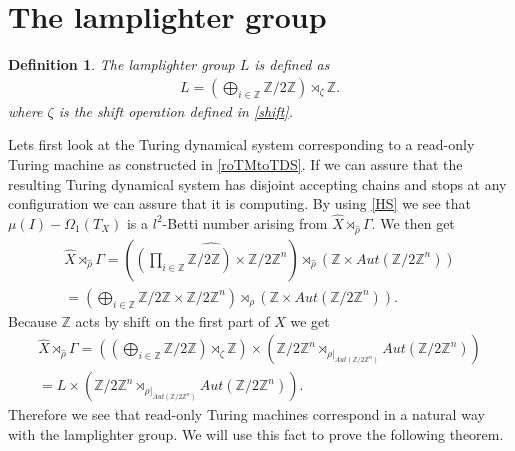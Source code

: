 \documentclass[12pt,a4paper]{scrartcl}
\newtheorem{Definition}[Theorem]{Definition}
\numberwithin{equation}{section}
\newcommand{\Z}{\mathbb{Z}} %
\newcommand{\2}{\mathbb{Z} / 2 \mathbb{Z}}
\newcommand{\1}{\overline{1}}
\newcommand{\0}{\overline{0}}
\begin{document}
\section{The lamplighter group}
\begin{Definition}
	The lamplighter group $L$ is defined as
	\begin{align*}
		L = (\bigoplus_{i \in \Z} \2) \rtimes_{\zeta} \Z.
	\end{align*}
	where $\zeta$ is the shift operation defined in \ref{shift}.
\end{Definition}
Lets first look at the Turing dynamical system corresponding to a read-only Turing machine as constructed in \ref{roTMtoTDS}. If we can assure that the resulting Turing dynamical system has disjoint accepting chains and stops at any configuration we can assure that it is computing. By using \ref{HS} we see that $\mu (I) - \Omega_1(T_X)$ is a $l^2$-Betti number arising from $\hat{X} \rtimes_{\hat{\rho}} \Gamma$. We then get
\begin{align*}
	\hat{X} \rtimes_{\hat{\rho}} \Gamma = (\widehat{(\prod_{i \in \Z} \2) \times \2^n}) \rtimes_{\hat{\rho}} (\Z \times Aut(\2^n)) \\
	= (\bigoplus_{i \in \Z} \2 \times \2^n) \rtimes_{\rho} (\Z \times Aut(\2^n)).
\end{align*}
Because $\Z$ acts by shift on the first part of $X$ we get
\begin{align*}
	\hat{X} \rtimes_{\hat{\rho}} \Gamma = ((\bigoplus_{i \in \Z} \2) \rtimes_{\zeta} \Z) \times (\2^n \rtimes_{\rho|_{Aut(\2^n)}} Aut(\2^n)) \\
	= L \times (\2^n \rtimes_{\rho|_{Aut(\2^n)}} Aut(\2^n)).
\end{align*}
Therefore we see that read-only Turing machines correspond in a natural way with the lamplighter group. We will use this fact to prove the following theorem.
\end{document}
